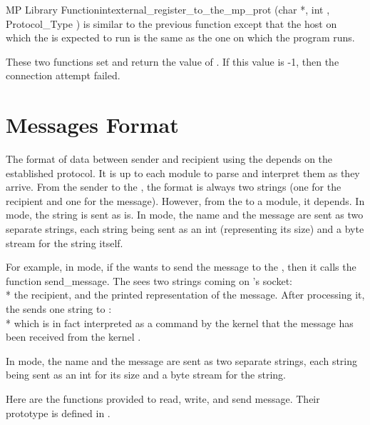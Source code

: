 \begin{typefn}{MP Library Function}{int}{external\_register\_to\_the\_mp\_prot}
        {(char *,  int , Protocol\_Type )}
is similar to the previous function except that the host on which the
\MPA{} is expected to run is the same as the one on which the
program runs.
\end{typefn}

These two functions set and return the value of . If this value
is -1, then the connection attempt failed.

\section{Messages Format}

The format of data between sender and recipient using the \MPA{} depends on the
established protocol. It is up to each module to parse and interpret them as
they arrive. From the sender to the \MPA{}, the format is always two strings
(one for the recipient and one for the message). However, from the \MPA{} to a
module, it depends. In  mode, the string  is sent as is. In  mode, the name and
the message are sent as two separate strings, each string being sent as an int
(representing its size) and a byte stream for the string itself.

For example, in  mode, if the \CPK{}  wants to send
the message  to the \CPK{} , then it
calls the function send\_message. The \MPA{} sees two strings coming on
's socket: \\*  the recipient, and  the printed representation of the message. After processing it, the
\MPA{} sends one string to : \\*  which is in fact interpreted as a command by the  kernel
that the message  has been received from the
kernel .

In  mode, the name and the message are sent as two separate
strings, each string being sent as an int for its size and a byte stream for
the string.

Here are the functions provided to read, write, and send message. Their
prototype is defined in .

